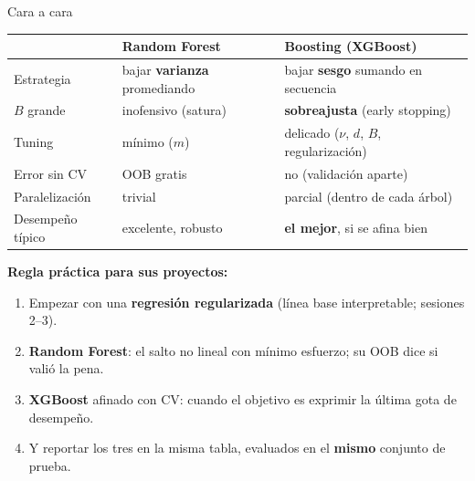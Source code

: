 \documentclass{beamer}
\newcommand{\1}{\mathbb{I}}
\begin{document}
\begin{frame}{Cara a cara}
\small
\begin{center}
\footnotesize
\setlength{\tabcolsep}{4pt}
\begin{tabular}{lll}
\hline
 & Random Forest & Boosting (XGBoost) \\
\hline
Estrategia & bajar \textbf{varianza} promediando & bajar \textbf{sesgo} sumando en secuencia \\
$B$ grande & inofensivo (satura) & \textbf{sobreajusta} (early stopping) \\
Tuning & mínimo ($m$) & delicado ($\nu$, $d$, $B$, regularización) \\
Error sin CV & OOB gratis & no (validación aparte) \\
Paralelización & trivial & parcial (dentro de cada árbol) \\
Desempeño típico & excelente, robusto & \textbf{el mejor}, si se afina bien \\
\hline
\end{tabular}
\end{center}
\pause

\vspace{0.25cm}
\textbf{Regla práctica para sus proyectos:}
\begin{enumerate}\itemsep4pt
  \item Empezar con una \textbf{regresión regularizada} (línea base interpretable; sesiones 2--3).
  \item \textbf{Random Forest}: el salto no lineal con mínimo esfuerzo; su OOB dice si valió la pena.
  \item \textbf{XGBoost} afinado con CV: cuando el objetivo es exprimir la última gota de desempeño.
  \item Y reportar los tres en la misma tabla, evaluados en el \textbf{mismo} conjunto de prueba.
\end{enumerate}
\end{frame}
\end{document}
